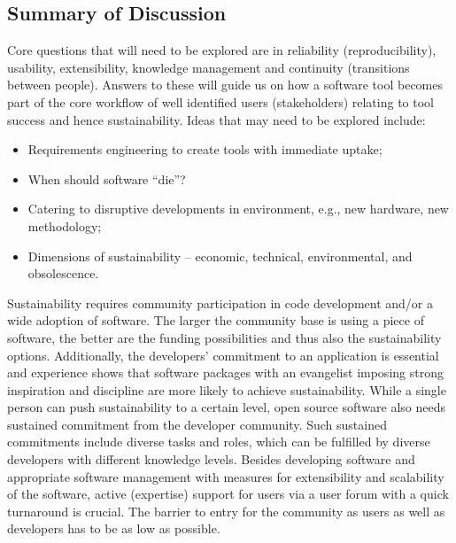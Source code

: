 \subsection{Summary of Discussion}

Core questions that will need to be explored are in reliability (reproducibility), usability, extensibility, knowledge management and continuity (transitions between people). Answers to these will guide us on how a software tool becomes part of the core workflow of well identified users (stakeholders) relating to tool success and hence sustainability.
Ideas that may need to be explored include:
\begin{itemize}

\item Requirements engineering to create tools with immediate uptake;

\item When should software ``die''?

\item Catering to disruptive developments in environment, e.g., new hardware,
new methodology;

\item Dimensions of sustainability -- economic, technical, environmental,
and obsolescence.

\end{itemize}

Sustainability requires community participation in code development and/or a
wide adoption of software. The larger the community base is using a piece of
software, the better are the funding possibilities and thus also the
sustainability options. Additionally, the developers’ commitment to an application is
essential and experience shows that software packages with an evangelist
imposing strong inspiration and discipline are more likely to achieve
sustainability. While a single person can push sustainability to a certain
level, open source software also needs sustained commitment from the developer
community. Such sustained commitments include diverse tasks and roles, which can
be fulfilled by diverse developers with different knowledge levels. Besides
developing software and appropriate software management with measures for
extensibility and scalability of the software, active (expertise) support for
users via a user forum with a quick turnaround is crucial. The barrier to entry
for the community as users as well as developers has to be as low as possible.


